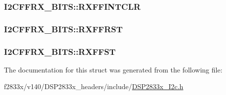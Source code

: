 \subsubsection[{R\+X\+F\+F\+I\+N\+T\+C\+L\+R}]{ I2\+C\+F\+F\+R\+X\+\_\+\+B\+I\+T\+S\+::\+R\+X\+F\+F\+I\+N\+T\+C\+L\+R}\label{struct_i2_c_f_f_r_x___b_i_t_s_a47c1b464d6ad7dd456440e78e602ca80}
\hypertarget{struct_i2_c_f_f_r_x___b_i_t_s_a91d3c2135e600a2b64d92618c5074eb5}{}
\subsubsection[{R\+X\+F\+F\+R\+S\+T}]{ I2\+C\+F\+F\+R\+X\+\_\+\+B\+I\+T\+S\+::\+R\+X\+F\+F\+R\+S\+T}\label{struct_i2_c_f_f_r_x___b_i_t_s_a91d3c2135e600a2b64d92618c5074eb5}
\hypertarget{struct_i2_c_f_f_r_x___b_i_t_s_a6de671f4e79e7b979a2eb5957ff76f55}{}
\subsubsection[{R\+X\+F\+F\+S\+T}]{ I2\+C\+F\+F\+R\+X\+\_\+\+B\+I\+T\+S\+::\+R\+X\+F\+F\+S\+T}\label{struct_i2_c_f_f_r_x___b_i_t_s_a6de671f4e79e7b979a2eb5957ff76f55}


The documentation for this struct was generated from the following file\+:\begin{DoxyCompactItemize}
\item 
f2833x/v140/\+D\+S\+P2833x\+\_\+headers/include/\hyperlink{_d_s_p2833x___i2c_8h}{D\+S\+P2833x\+\_\+\+I2c.\+h}\end{DoxyCompactItemize}
